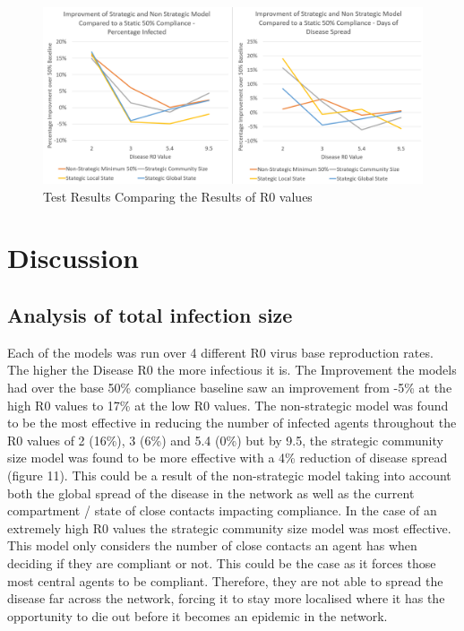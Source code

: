 \documentclass{article}
\begin{document}
\begin{figure}[h!]
\centering
\includegraphics[width=\textwidth]{1}
\caption{Test Results Comparing the Results of R0 values}
\end{figure}
\newpage


\section{Discussion}

\subsection{Analysis of total infection size}

Each of the models was run over 4 different R0 virus base reproduction rates. The higher the Disease R0 the more infectious it is. The Improvement the models had over the base 50\% compliance baseline saw an improvement from -5\% at the high R0 values to 17\% at the low R0 values. The non-strategic model was found to be the most effective in reducing the number of infected agents throughout the R0 values of 2 (16\%), 3 (6\%) and 5.4 (0\%) but by 9.5, the strategic community size model was found to be more effective with a 4\% reduction of disease spread (figure 11). This could be a result of the non-strategic model taking into account both the global spread of the disease in the network as well as the current compartment / state of close contacts impacting compliance. In the case of an extremely high R0 values the strategic community size model was most effective.  This model only considers the number of close contacts an agent has when deciding if they are compliant or not. This could be the case as it forces those most central agents to be compliant. Therefore, they are not able to spread the disease far across the network, forcing it to stay more localised where it has the opportunity to die out before it becomes an epidemic in the network.\newline 
\end{document}
